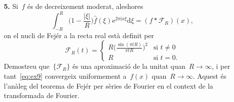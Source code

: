 \documentclass[a4paper]{article}
\theoremstyle{definition}
\newcommand{\iu}{\mathrm{i}}
\newcommand{\e}{\mathrm{e}}
\newcommand{\uppi}{\pi}
\newcommand{\diff}{\mathrm{d}}
\newcommand{\abs}[1]{\lvert{#1}\rvert}
\newcommand{\F}{\mathcal{F}}
\newcommand{\conv}{\mathop{\ast}}
\begin{document}
\begin{enumerate}
    \item[\textbf{5.}] Si~\(f\) és de decreixement moderat, aleshores
        \begin{equation}
            \label{eq:ex9}
            \int_{-R}^{R}\biggl(1 - \frac{\abs{\xi}}{R}\biggr)
            \widehat{f}(\xi)\e^{2\uppi\iu x\xi}\diff\xi
            = (f\conv\F_{R})(x),
        \end{equation}
        on el nucli de Fejér a la recta real està definit per
        \[
            \F_{R}(t) = \begin{cases}\displaystyle
                R\biggl(\frac{\sin(\uppi tR)}{\uppi tR}\biggr)^{2}
                & \text{si } t \neq 0 \\
                R & \text{si } t = 0.
            \end{cases}
        \]
        Demostreu que~\(\{\F_{R}\}\) és una aproximació de la unitat
        quan~\(R\to\infty\), i per tant~\ref{eq:ex9} convergeix uniformement
        a~\(f(x)\) quan~\(R\to\infty\).
        Aquest és l'anàleg del teorema de Fejér per sèries de Fourier en el
        context de la transformada de Fourier.
\end{enumerate}
\end{document}
